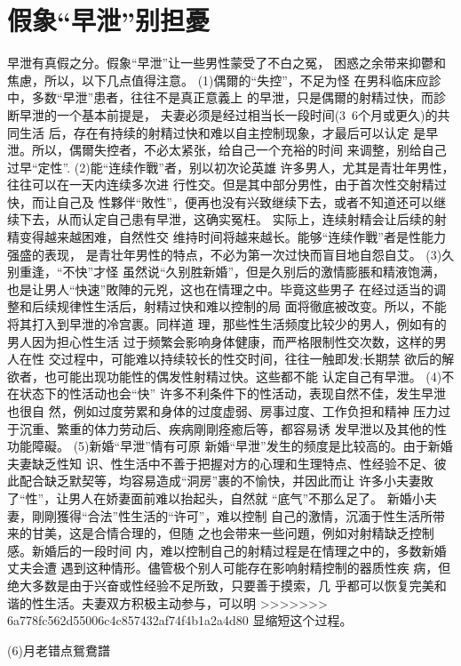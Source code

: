 \documentclass[12pt,UTF8]{ctexbook}
\begin{document}
\section{假象“早泄”别担憂}

早泄有真假之分。假象“早泄”让一些男性蒙受了不白之冤，
困惑之余带来抑鬱和焦慮，所以，以下几点值得注意。
(1)偶爾的“失控”，不足为怪
在男科临床应診中，多数“早泄”患者，往往不是真正意義上
的早泄，只是偶爾的射精过快，而診断早泄的一个基本前提是，
夫妻必须是经过相当长一段时间(3~6个月或更久)的共同生活
后，存在有持续的射精过快和难以自主控制现象，才最后可以认定
是早泄。所以，偶爾失控者，不必太紧张，给自己一个充裕的时间
来调整，别给自己过早“定性”.
(2)能“连续作戰”者，别以初次论英雄
许多男人，尤其是青壮年男性，往往可以在一天内连续多次进
行性交。但是其中部分男性，由于首次性交射精过快，而让自己及
性夥伴“敗性”，便再也没有兴致继续下去，或者不知道还可以继
续下去，从而认定自己患有早泄，这确实冤枉。
实际上，连续射精会让后续的射精变得越来越困难，自然性交
维持时间将越来越长。能够“连续作戰”者是性能力强盛的表现，
是青壮年男性的特点，不必为第一次过快而盲目地自怨自艾。
(3)久别重逢，“不快”才怪
虽然说“久别胜新婚”，但是久别后的激情膨脹和精液饱满，
也是让男人“快速”敗陣的元兇，这也在情理之中。毕竟这些男子
在经过适当的调整和后续规律性生活后，射精过快和难以控制的局
面将徹底被改变。所以，不能将其打入到早泄的冷宫裹。同样道
理，那些性生活频度比较少的男人，例如有的男人因为担心性生活
过于频繁会影响身体健康，而严格限制性交次数，这样的男人在性
交过程中，可能难以持续较长的性交时间，往往一触即发;长期禁
欲后的解欲者，也可能出现功能性的偶发性射精过快。这些都不能
认定自己有早泄。
(4)不在状态下的性活动也会“快”
许多不利条件下的性活动，表现自然不佳，发生早泄也很自
然，例如过度劳累和身体的过度虚弱、房事过度、工作负担和精神
压力过于沉重、繁重的体力劳动后、疾病剛剛痊癒后等，都容易诱
发早泄以及其他的性功能障礙。
(5)新婚“早泄”情有可原
新婚“早泄”发生的频度是比较高的。由于新婚夫妻缺乏性知
识、性生活中不善于把握对方的心理和生理特点、性经验不足、彼
此配合缺乏默契等，均容易造成“洞房”裹的不愉快，并因此而让
许多小夫妻敗了“性”，让男人在娇妻面前难以抬起头，自然就
“底气”不那么足了。
新婚小夫妻，剛剛獲得“合法”性生活的“许可”，难以控制
自己的激情，沉湎于性生活所带来的甘美，这是合情合理的，但随
之也会带来一些问題，例如对射精缺乏控制感。新婚后的一段时间
内，难以控制自己的射精过程是在情理之中的，多数新婚丈夫会遭
遇到这种情形。儘管极个别人可能存在影响射精控制的器质性疾
病，但绝大多数是由于兴奋或性经验不足所致，只要善于摸索，几
乎都可以恢复完美和谐的性生活。夫妻双方积极主动参与，可以明
>>>>>>> 6a778fc562d55006c4c857432af74f4b1a2a4d80
显缩短这个过程。

(6)月老错点鴛鴦譜
\end{document}
